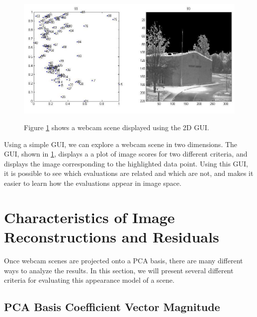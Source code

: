 \begin{figure}[h]
	\centering
		\includegraphics[width=1\textwidth]{figures/2dGui.jpg}
	\label{fig:2dGui}
	
		\caption[Exploring 2D image space using a simple GUI.]{Figure \ref{fig:2dGui} shows a webcam scene displayed using the 2D GUI.}		
\end{figure}

Using a simple GUI, we can explore a webcam scene in two dimensions.  The GUI, shown in \ref{fig:2dGui}, displays a a plot of image scores for two different criteria, and displays the image corresponding to the highlighted data point.  Using this GUI, it is possible to see which evaluations are related and which are not, and makes it easier to learn how the evaluations appear in image space.


\section{Characteristics of Image Reconstructions and Residuals}

Once webcam scenes are projected onto a PCA basis, there are many different ways to analyze the results.  In this section, we will present several different criteria for evaluating this appearance model of a scene.

\subsection{PCA Basis Coefficient Vector Magnitude}

